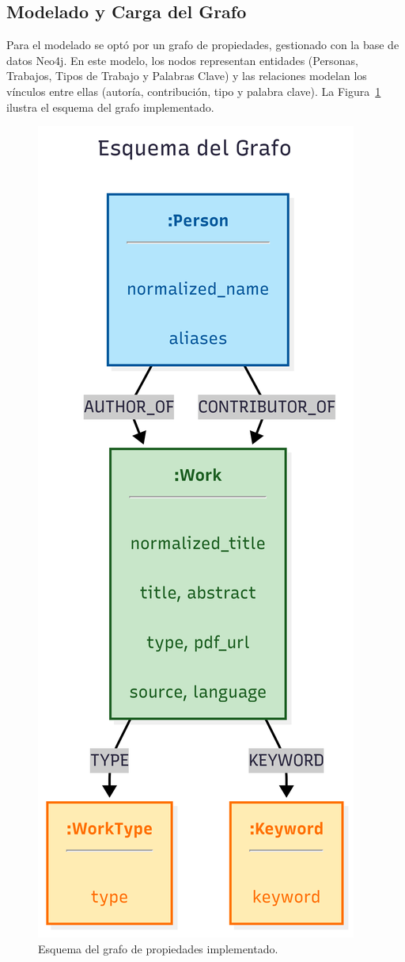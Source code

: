 \documentclass[journal]{IEEEtran}
\begin{document}
\subsection{Modelado y Carga del Grafo}
Para el modelado se optó por un grafo de propiedades, gestionado con la base de datos Neo4j. En este modelo, los nodos representan entidades (Personas, Trabajos, Tipos de Trabajo y Palabras Clave) y las relaciones modelan los vínculos entre ellas (autoría, contribución, tipo y palabra clave). La Figura~\ref{fig:grafo} ilustra el esquema del grafo implementado.

\begin{figure}[h]
	\centering
	\includegraphics[width=0.6\linewidth]{imagenes/grafo.png}
	\caption{Esquema del grafo de propiedades implementado.}
	\label{fig:grafo}
\end{figure}
\end{document}
